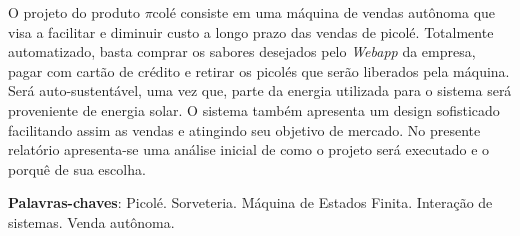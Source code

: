 \begin{resumo}

O projeto do produto $\pi$colé consiste em uma máquina de vendas autônoma que visa a facilitar e diminuir custo a longo prazo das vendas de picolé. Totalmente automatizado, basta comprar os sabores desejados pelo \textit{Webapp} da empresa, pagar com cartão de crédito e retirar os picolés que serão liberados pela máquina. Será auto-sustentável, uma vez que, parte da energia utilizada para o sistema será proveniente de energia solar. O sistema também apresenta um design sofisticado facilitando assim as vendas e atingindo seu objetivo de mercado. No presente relatório apresenta-se uma análise inicial de como o projeto será executado e o porquê de sua escolha.



 \vspace{\onelineskip}
    
 \noindent
 \textbf{Palavras-chaves}: Picolé. Sorveteria. Máquina de Estados Finita. Interação de sistemas. Venda autônoma.
\end{resumo}

